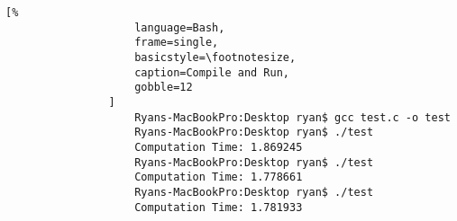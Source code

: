 \documentclass[crop=false,class=book,oneside]{standalone}
\begin{document}
                \newpage
                \begin{lstlisting}[%
                    language=Bash,
                    frame=single,
                    basicstyle=\footnotesize,
                    caption=Compile and Run,
                    gobble=12
                ]
                    Ryans-MacBookPro:Desktop ryan$ gcc test.c -o test
                    Ryans-MacBookPro:Desktop ryan$ ./test
                    Computation Time: 1.869245
                    Ryans-MacBookPro:Desktop ryan$ ./test
                    Computation Time: 1.778661
                    Ryans-MacBookPro:Desktop ryan$ ./test
                    Computation Time: 1.781933
                \end{lstlisting}
\end{document}
